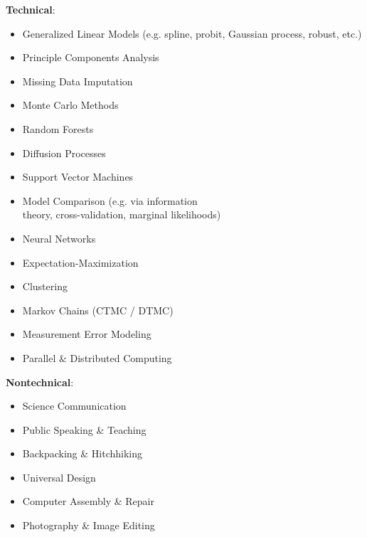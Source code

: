 \documentclass[11pt,margin,line]{resume}
\begin{document}
\begin{resume}
\textbf{Technical}:\vspace{-4.5mm}
\begin{multicols}{2}
    \begin{itemize}
    \setlength\itemsep{-0.2em}
         \item Generalized Linear Models (e.g. spline, probit, Gaussian process, robust, etc.)
         \item Principle Components Analysis
         \item Missing Data Imputation
	\item Monte Carlo Methods
         \item Random Forests
	\item Diffusion Processes
         \item Support Vector Machines
	\item Model Comparison (e.g. via information\\ theory, cross-validation, marginal likelihoods)
         \item Neural Networks
	\item Expectation-Maximization
	\item Clustering
	\item Markov Chains (CTMC / DTMC)
	\item Measurement Error Modeling
	\item Parallel \& Distributed Computing
    \end{itemize}
    \end{multicols}\vspace{-4.5mm}

\begin{comment}
\textbf{Nontechnical}: Science Communication, Teaching, Hitchhiking, Public Speaking, Backpacking, Data Visualization, Computer Assembly \& Repair, Universal Design, Photography, Image Editing 
\end{comment}

\textbf{Nontechnical}:\vspace{-4.5mm}
\begin{multicols}{2}
    \begin{itemize}
    \setlength\itemsep{-0.2em}
         \item Science Communication 
         \item Public Speaking \& Teaching
         \item Backpacking \& Hitchhiking
         \item Universal Design
         \item Computer Assembly \& Repair
         \item Photography \& Image Editing
    \end{itemize}
    \end{multicols}\vspace{-4.5mm}


\end{resume}
\end{document}
